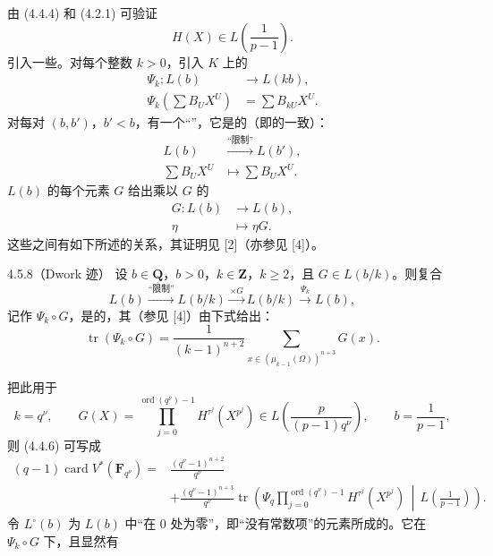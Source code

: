 由 (4.4.4) 和 (4.2.1) 可验证
\[
H(X)\in L\left(\frac1{p-1}\right).
\]
引入一些。对每个整数 $k>0$，引入 $K$ 上的
\[
\begin{aligned}
\Psi_k:L(b)&\longrightarrow L(kb),\\
\Psi_k\left(\sum B_UX^U\right)&=\sum B_{kU}X^U.
\end{aligned}\tag{4.5.5}
\]
对每对 $(b,b')$，$b'<b$，有一个“”，它是的（即的一致）：
\[
\begin{aligned}
L(b)&\xrightarrow{\text{“限制”}}L(b'),\\
\sum B_UX^U&\longmapsto\sum B_UX^U.
\end{aligned}\tag{4.5.6}
\]
 $L(b)$ 的每个元素 $G$ 给出乘以 $G$ 的
\[
\begin{aligned}
G:L(b)&\longrightarrow L(b),\\
\eta&\longmapsto\eta G.
\end{aligned}\tag{4.5.7}
\]
这些之间有如下所述的关系，其证明见 [2]（亦参见 [4]）。
\begin{SGAresult}{}{4.5.8（Dwork 迹）}
设 $b\in\mathbf Q$，$b>0$，$k\in\mathbf Z$，$k\ge2$，且 $G\in L(b/k)$。则复合
\[
L(b)\xrightarrow{\text{“限制”}}L(b/k)\xrightarrow{\times G}L(b/k)\xrightarrow{\Psi_k}L(b),
\]
记作 $\Psi_k\circ G$，是的，其（参见 [4]）由下式给出：
\[
\operatorname{tr}(\Psi_k\circ G)=\frac1{(k-1)^{n+2}}
\sum_{x\in(\mu_{k-1}(\Omega))^{n+3}}G(x).\tag{4.5.9}
\]
\end{SGAresult}
把此用于
\[
k=q^\nu,\qquad G(X)=\prod_{j=0}^{\operatorname{ord}(q^\nu)-1}H^{\tau^j}(X^{p^j})
\in L\left(\frac p{(p-1)q^\nu}\right),\qquad b=\frac1{p-1},
\]
则 (4.4.6) 可写成
\[
\begin{aligned}
(q-1)\operatorname{card}V^*(\mathbf F_{q^\nu})
={}&\frac{(q^\nu-1)^{n+2}}{q^\nu}\\
&+\frac{(q^\nu-1)^{n+3}}{q^\nu}\operatorname{tr}\left(
\Psi_q\prod_{j=0}^{\operatorname{ord}(q^\nu)-1}H^{\tau^j}(X^{p^j})\,\middle|\,
L\left(\frac1{p-1}\right)\right).
\end{aligned}\tag{4.5.10}
\]
令 $L^\circ(b)$ 为 $L(b)$ 中“在 $0$ 处为零”，即“没有常数项”的元素所成的。它在 $\Psi_k\circ G$ 下，且显然有
